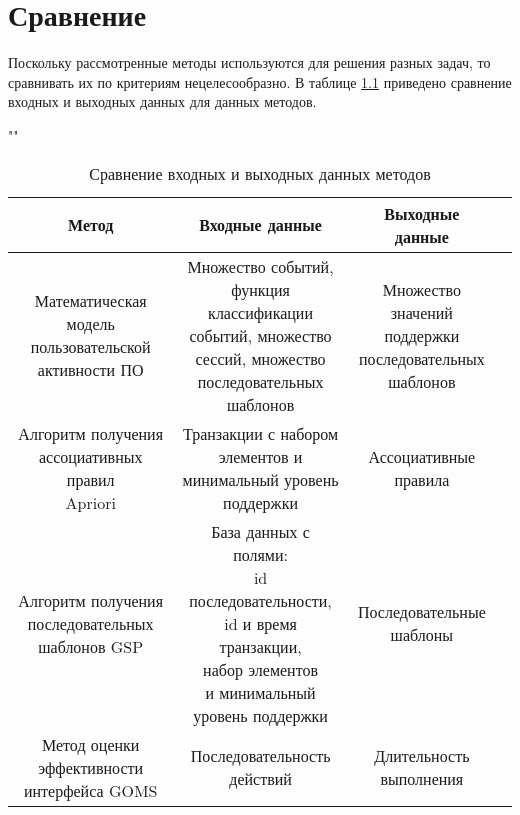 \chapter{Сравнение}

Поскольку рассмотренные методы используются для решения разных задач, то сравнивать их по критериям нецелесообразно. В таблице \ref{tab} приведено сравнение входных и выходных данных для данных методов.

\begin{table}[H]
	\begin{center}
		\caption{Сравнение входных и выходных данных методов}
		\label{tab}
		""\newline
		\begin{tabular}{ | c | c | c | c | }
			\hline
			Метод & Входные данные  & Выходные данные \\ \hline
			\specialcell{Математическая модель \\ пользовательской \\ активности ПО} & \specialcell{Множество событий, \\ функция классификации \\ событий, множество \\ сессий, множество \\ последовательных \\ шаблонов } & \specialcell{Множество \\ значений \\ поддержки \\ последовательных \\ шаблонов} \\ \hline
			\specialcell{Алгоритм получения \\ ассоциативных правил \\ Apriori} & \specialcell{Транзакции с набором \\ элементов и \\ минимальный уровень \\ поддержки} & \specialcell{Ассоциативные \\ правила} \\ \hline
			\specialcell{Алгоритм получения \\ последовательных \\ шаблонов GSP} & \specialcell{База данных с полями: \\ id последовательности, \\ id и время транзакции, \\ набор элементов \\ и минимальный \\ уровень поддержки} & \specialcell{Последовательные \\ шаблоны} \\ \hline
			\specialcell{Метод оценки \\ эффективности \\ интерфейса GOMS} & \specialcell{Последовательность \\ действий} & \specialcell{Длительность \\ выполнения} \\ \hline
		\end{tabular}
	\end{center}
\end{table}